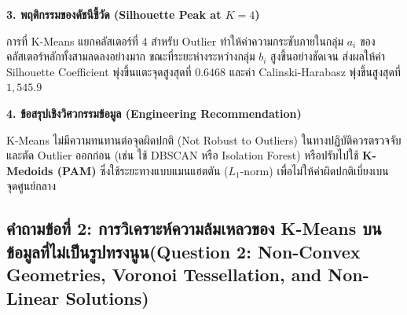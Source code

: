 \documentclass[12pt,a4paper]{article}
\begin{document}
\begin{ansbox}[unbreakable, fontupper={\fontsize{9.8pt}{13.0pt}\selectfont}, left=6pt, right=6pt, top=3pt, bottom=3pt]
\vspace{0.15em}
\noindent\textbf{\normalsize 3. พฤติกรรมของดัชนีชี้วัด (Silhouette Peak at $K=4$)}\par\vspace{0.05em}
การที่ K-Means แยกคลัสเตอร์ที่ 4 สำหรับ Outlier ทำให้ค่าความกระชับภายในกลุ่ม $a_i$ ของคลัสเตอร์หลักทั้งสามลดลงอย่างมาก ขณะที่ระยะห่างระหว่างกลุ่ม $b_i$ สูงขึ้นอย่างชัดเจน ส่งผลให้ค่า Silhouette Coefficient พุ่งขึ้นแตะจุดสูงสุดที่ \textbf{$0.6468$} และค่า Calinski-Harabasz พุ่งขึ้นสูงสุดที่ \textbf{$1,545.9$}

\vspace{0.15em}
\noindent\textbf{\normalsize 4. ข้อสรุปเชิงวิศวกรรมข้อมูล (Engineering Recommendation)}\par\vspace{0.05em}
K-Means ไม่มีความทนทานต่อจุดผิดปกติ (Not Robust to Outliers) ในทางปฏิบัติควรตรวจจับและตัด Outlier ออกก่อน (เช่น ใช้ DBSCAN หรือ Isolation Forest) หรือปรับไปใช้ \textbf{K-Medoids (PAM)} ซึ่งใช้ระยะทางแบบแมนแฮตตัน ($L_1$-norm) เพื่อไม่ให้ค่าผิดปกติเบี่ยงเบนจุดศูนย์กลาง
\end{ansbox}

\clearpage
\subsection*{คำถามข้อที่ 2: การวิเคราะห์ความล้มเหลวของ K-Means บนข้อมูลที่ไม่เป็นรูปทรงนูน\newline \normalsize(Question 2: Non-Convex Geometries, Voronoi Tessellation, and Non-Linear Solutions)}
\vspace{-0.5em}
\end{document}
